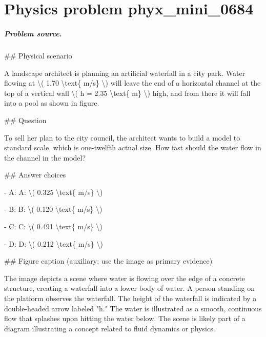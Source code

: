 
\chapter{Physics problem phyx\_mini\_0684}
\label{ch:PhyXMiniProblems_problem_phyx_mini_0684}

\paragraph{Problem source.}
\#\# Physical scenario

A landscape architect is planning an artificial waterfall in a city park. Water flowing at \textbackslash{}( 1.70 \textbackslash{}text\{ m/s\} \textbackslash{}) will leave the end of a horizontal channel at the top of a vertical wall \textbackslash{}( h = 2.35 \textbackslash{}text\{ m\} \textbackslash{}) high, and from there it will fall into a pool as shown in figure.

\#\# Question

To sell her plan to the city council, the architect wants to build a model to standard scale, which is one-twelfth actual size. How fast should the water flow in the channel in the model?

\#\# Answer choices

- A: A: \textbackslash{}( 0.325 \textbackslash{}text\{ m/s\} \textbackslash{})

- B: B: \textbackslash{}( 0.120 \textbackslash{}text\{ m/s\} \textbackslash{})

- C: C: \textbackslash{}( 0.491 \textbackslash{}text\{ m/s\} \textbackslash{})

- D: D: \textbackslash{}( 0.212 \textbackslash{}text\{ m/s\} \textbackslash{})

\#\# Figure caption (auxiliary; use the image as primary evidence)

The image depicts a scene where water is flowing over the edge of a concrete structure, creating a waterfall into a lower body of water. A person standing on the platform observes the waterfall. The height of the waterfall is indicated by a double-headed arrow labeled "h." The water is illustrated as a smooth, continuous flow that splashes upon hitting the water below. The scene is likely part of a diagram illustrating a concept related to fluid dynamics or physics.

